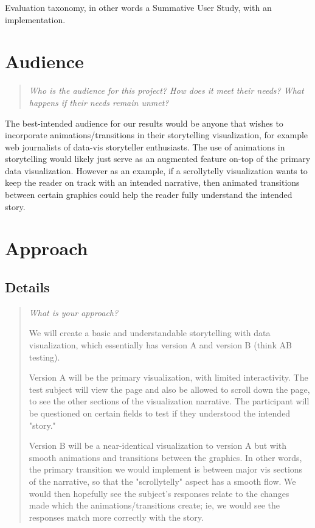 \documentclass{proc}
\begin{document}
Evaluation taxonomy, in other words a Summative User Study, with an implementation.

\section{Audience} 
\begin{quote}
\textit{Who is the audience for this project? 
How does it meet their needs? 
What happens if their needs remain unmet?}
\end{quote}

The best-intended audience for our results would be anyone that wishes to incorporate animations/transitions in their storytelling visualization, for example web journalists of data-vis storyteller enthusiasts. The use of animations in storytelling would likely just serve as an augmented feature on-top of the primary data visualization. However as an example, if a scrollytelly visualization wants to keep the reader on track with an intended narrative, then animated transitions between certain graphics could help the reader fully understand the intended story.

\section{Approach}
\subsection{Details}
\begin{quote}
\textit{What is your approach?}

We will create a basic and understandable storytelling with data visualization, which essentially has version A and version B (think AB testing). 

Version A will be the primary visualization, with limited interactivity. The test subject will view the page and also be allowed to scroll down the page, to see the other sections of the visualization narrative. The participant will be questioned on certain fields to test if they understood the intended "story."

Version B will be a near-identical visualization to version A but with smooth animations and transitions between the graphics. In other words, the primary transition we would implement is between major vis sections of the narrative, so that the "scrollytelly" aspect has a smooth flow. We would then hopefully see the subject's responses relate to the changes made which the animations/transitions create; ie, we would see the responses match more correctly with the story.

\end{quote}
\end{document}
